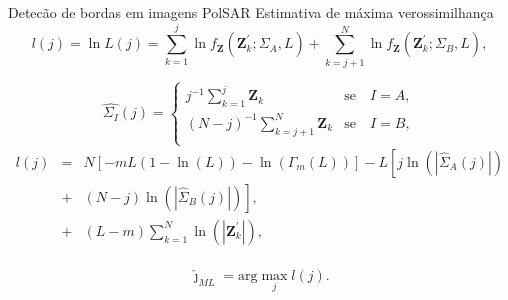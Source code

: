 \documentclass[10pt]{beamer}
\begin{document}
\begin{frame}{Detecão de bordas em imagens PolSAR}
\alert{Estimativa de máxima verossimilhança}
\begin{equation}\label{cap_acf_19}
	l(j)=\ln L(j)=\sum_{k=1}^{j}\ln f_{\mathbf{Z}}(\mathbf{Z}_{k}^{'};\Sigma_{A},L)+ \sum_{k=j+1}^{N}\ln f_{\mathbf{Z}}(\mathbf{Z}_{k}^{'};\Sigma_{B},L),
\end{equation}

\begin{equation}\label{cap_acf_20}
\widehat{\Sigma_{I}}(j) = \left\{
\begin{array}{lc}
	j^{-1}\sum_{k=1}^{j}\mathbf{Z}_{k}  & \mbox{se}\quad I=A,  \\
        (N-j)^{-1}\sum_{k=j+1}^{N}\mathbf{Z}_{k} & \mbox{se}\quad I=B, \\
\end{array}
\right.
\end{equation}
\begin{equation}\label{cap_acf_21}
\begin{array}{rcl}
	l(j)&=&N\left[-mL(1-\ln{\left(L\right)})-\ln{\left(\Gamma_m(L)\right)}\right]-L\left[j\ln{\left(|\widehat{\Sigma}_{A}(j)|\right)}\right. \\	
	&+&\left.(N-j)\ln{\left(|\widehat{\Sigma}_{B}(j)|\right)}\right], \\
	&+&(L-m)\sum_{k=1}^{N}\ln{\left(|\mathbf{Z}_{k}^{'}|\right)}, \\
\end{array}
\end{equation}

\begin{equation}\label{cap_acf_22}
	\widehat{\jmath}_{ML}=\text{arg}\max\limits_{j}l(j).  
\end{equation}
  
\end{frame}
\end{document}

